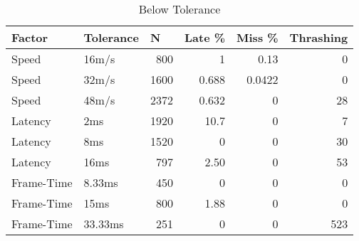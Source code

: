 %
%

\begin{table}
	\centering
	\begin{tabular}{llrrrr}
		\toprule
		\multicolumn{1}{l}{Factor} & \multicolumn{1}{l}{Tolerance} & \multicolumn{1}{l}{N} & \multicolumn{1}{l}{Late \%} & \multicolumn{1}{l}{Miss \%} & \multicolumn{1}{l}{Thrashing}  \\ 
		\hline
		Speed      & 16m/s     & 800  & 1     & 0.13       &    0             \\
		Speed      & 32m/s     & 1600 & 0.688 & 0.0422     &    0             \\
		Speed      & 48m/s     & 2372  & 0.632& 0          &    28            \\
		Latency    & 2ms       & 1920  & 10.7 & 0          &    7             \\
		Latency    & 8ms       & 1520  & 0    & 0          &    30            \\
		Latency    & 16ms      & 797  & 2.50  & 0          &    53            \\
		Frame-Time & 8.33ms    & 450  & 0     & 0          &    0             \\
		Frame-Time & 15ms      & 800  & 1.88  & 0          &    0             \\
		Frame-Time & 33.33ms   & 251  & 0     & 0          &    523           \\
		\bottomrule
	\end{tabular}
	\caption{Below Tolerance}
	\label{tab_BelowTolerance}
\end{table}

